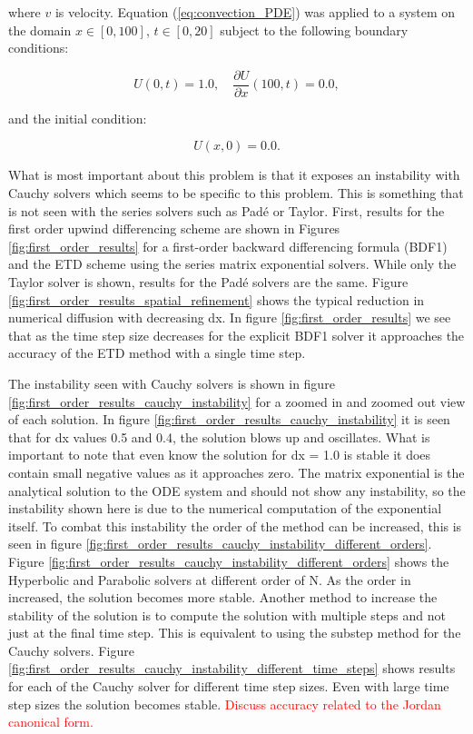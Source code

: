 \noindent where $v$ is velocity. Equation (\ref{eq:convection_PDE}) was applied to a system on the domain $x \in [0, 100]$, $t \in [0, 20]$ subject to the following boundary conditions:

\begin{equation}
    U(0,t) = 1.0, \quad\frac{\partial U}{\partial x}(100, t) = 0.0,
\end{equation}

\noindent and the initial condition:

\begin{equation}
    U(x,0) = 0.0.
\end{equation}

What is most important about this problem is that it exposes an instability with Cauchy solvers which seems to be specific to this problem. This is something that is not seen with the series solvers such as Pad\'e or Taylor. First, results for the first order upwind differencing scheme are shown in Figures \ref{fig:first_order_results}  for a first-order backward differencing formula (BDF1) and the ETD scheme using the series matrix exponential solvers. While only the Taylor solver is shown, results for the Pad\'e solvers are the same. Figure \ref{fig:first_order_results_spatial_refinement} shows the typical reduction in numerical diffusion with decreasing dx. In figure \ref{fig:first_order_results} we see that as the time step size decreases for the explicit BDF1 solver it approaches the accuracy of the ETD method with a single time step. 

The instability seen with Cauchy solvers is shown in figure \ref{fig:first_order_results_cauchy_instability} for a zoomed in and zoomed out view of each solution. In figure \ref{fig:first_order_results_cauchy_instability} it is seen that for dx values 0.5 and 0.4, the solution blows up and oscillates. What is important to note that even know the solution for dx = 1.0 is stable it does contain small negative values as it approaches zero. The matrix exponential is the analytical solution to the ODE system and should not show any instability, so the instability shown here is due to the numerical computation of the exponential itself. To combat this instability the order of the method can be increased, this is seen in figure \ref{fig:first_order_results_cauchy_instability_different_orders}. Figure \ref{fig:first_order_results_cauchy_instability_different_orders} shows the Hyperbolic and Parabolic solvers at different order of N. As the order in increased, the solution becomes more stable.  Another method to increase the stability of the solution is to compute the solution with multiple steps and not just at the final time step. This is equivalent to using the substep method for the Cauchy solvers. Figure \ref{fig:first_order_results_cauchy_instability_different_time_steps} shows results for each of the Cauchy solver for different time step sizes. Even with large time step sizes the solution becomes stable.   \textcolor{red}{Discuss accuracy related to the Jordan canonical form.}

